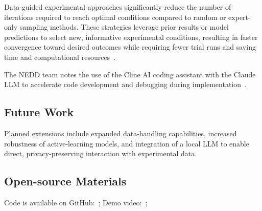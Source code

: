 Data-guided experimental approaches significantly reduce the number of iterations required to reach optimal conditions compared to random or expert-only sampling methods. These strategies leverage prior results or model predictions to select new, informative experimental conditions, resulting in faster convergence toward desired outcomes while requiring fewer trial runs and saving time and computational resources~\cite{chhajer2024rationalised}.

The NEDD team notes the use of the Cline AI coding assistant with the Claude LLM to accelerate code development and debugging during implementation~\cite{cline2024nedd}.

\subsection*{Future Work}
Planned extensions include expanded data-handling capabilities, increased robustness of active-learning models, and integration of a local LLM to enable direct, privacy-preserving interaction with experimental data.

\subsection*{Open-source Materials}
Code is available on GitHub: \,; Demo video: \,;






